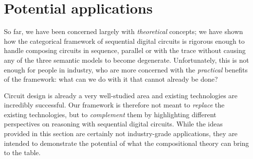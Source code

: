 \chapter{Potential applications}\label{chap:semantics-applications}

So far, we have been concerned largely with \emph{theoretical} concepts; we have
shown how the categorical framework of sequential digital circuits is rigorous
enough to handle composing circuits in sequence, parallel or with the trace
without causing any of the three semantic models to become degenerate.
Unfortunately, this is not enough for people in industry, who are more concerned
with the \emph{practical} benefits of the framework: what can we do with it that
cannot already be done?

Circuit design is already a very well-studied area and existing technologies are
incredibly successful.
Our framework is therefore not meant to \emph{replace} the existing
technologies, but to \emph{complement} them by highlighting different
perspectives on reasoning with sequential digital circuits.
While the ideas provided in this section are certainly not industry-grade
applications, they are intended to demonstrate the potential of what
the compositional theory can bring to the table.









